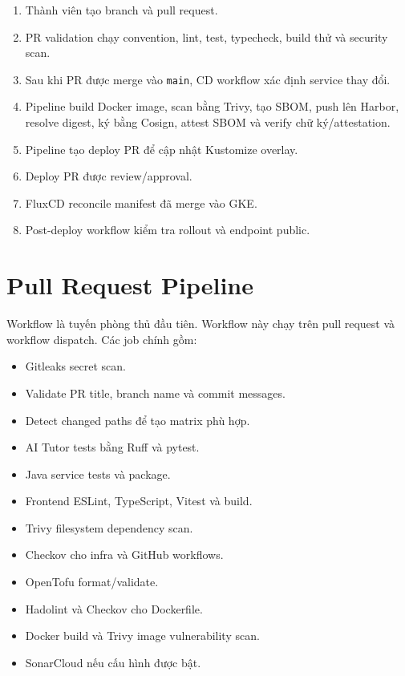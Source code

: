 \begin{enumerate}
  \item Thành viên tạo branch và pull request.
  \item PR validation chạy convention, lint, test, typecheck, build thử và security scan.
  \item Sau khi PR được merge vào \texttt{main}, CD workflow xác định service thay đổi.
  \item Pipeline build Docker image, scan bằng Trivy, tạo SBOM, push lên Harbor, resolve digest, ký bằng Cosign, attest SBOM và verify chữ ký/attestation.
  \item Pipeline tạo deploy PR để cập nhật Kustomize overlay.
  \item Deploy PR được review/approval.
  \item FluxCD reconcile manifest đã merge vào GKE.
  \item Post-deploy workflow kiểm tra rollout và endpoint public.
\end{enumerate}

\label{fig:pipeline-overall}

\section{Pull Request Pipeline}

Workflow  là tuyến phòng thủ đầu tiên. Workflow này chạy trên pull request và workflow dispatch. Các job chính gồm:

\begin{itemize}
  \item Gitleaks secret scan.
  \item Validate PR title, branch name và commit messages.
  \item Detect changed paths để tạo matrix phù hợp.
  \item AI Tutor tests bằng Ruff và pytest.
  \item Java service tests và package.
  \item Frontend ESLint, TypeScript, Vitest và build.
  \item Trivy filesystem dependency scan.
  \item Checkov cho infra và GitHub workflows.
  \item OpenTofu format/validate.
  \item Hadolint và Checkov cho Dockerfile.
  \item Docker build và Trivy image vulnerability scan.
  \item SonarCloud nếu cấu hình được bật.
\end{itemize}

